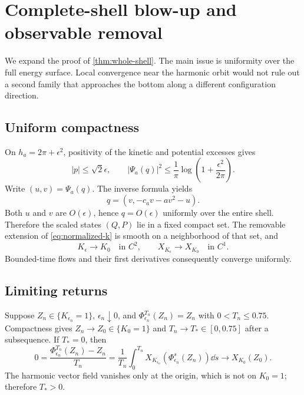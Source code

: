 \section{Complete-shell blow-up and observable removal}
\label{app:whole-shell}

We expand the proof of \cref{thm:whole-shell}.  The main issue is uniformity
over the full energy surface.  Local convergence near the harmonic orbit
would not rule out a second family that approaches the bottom along a
different configuration direction.

\subsection{Uniform compactness}

On \(h_a=2\pi+\epsilon^2\), positivity of the kinetic and potential excesses
gives
\begin{equation}
 |p|\le\sqrt2\epsilon,
 \qquad
 |\Psi_a(q)|^2
 \le\frac{1}{\pi}\log\left(1+\frac{\epsilon^2}{2\pi}\right).
 \label{eq:whole-shell-basic-bound}
\end{equation}
Write \((u,v)=\Psi_a(q)\).  The inverse formula yields
\begin{equation}
 q=(v,-c_av-av^2-u).
 \label{eq:inverse-bound-use}
\end{equation}
Both \(u\) and \(v\) are \(O(\epsilon)\), hence \(q=O(\epsilon)\)
uniformly over the entire shell.  Therefore the scaled states \((Q,P)\) lie
in a fixed compact set.  The removable extension of
\cref{eq:normalized-k} is smooth on a neighborhood of that set, and
\begin{equation}
 K_\epsilon\to K_0\quad\text{in }C^2,
 \qquad
 X_{K_\epsilon}\to X_{K_0}\quad\text{in }C^1.
 \label{eq:flow-convergence}
\end{equation}
Bounded-time flows and their first derivatives consequently converge
uniformly.

\subsection{Limiting returns}

Suppose \(Z_n\in\{K_{\epsilon_n}=1\}\), \(\epsilon_n\downarrow0\), and
\(\Phi_{\epsilon_n}^{T_n}(Z_n)=Z_n\) with \(0<T_n\le0.75\).  Compactness
gives \(Z_n\to Z_0\in\{K_0=1\}\) and \(T_n\to T_*\in[0,0.75]\) after a
subsequence.  If \(T_*=0\), then
\begin{equation}
 0=\frac{\Phi_{\epsilon_n}^{T_n}(Z_n)-Z_n}{T_n}
 =\frac{1}{T_n}\int_0^{T_n}
 X_{K_{\epsilon_n}}(\Phi_{\epsilon_n}^s(Z_n))\dd s
 \longrightarrow X_{K_0}(Z_0).
 \label{eq:no-small-return}
\end{equation}
The harmonic vector field vanishes only at the origin, which is not on
\(K_0=1\); therefore \(T_*>0\).

